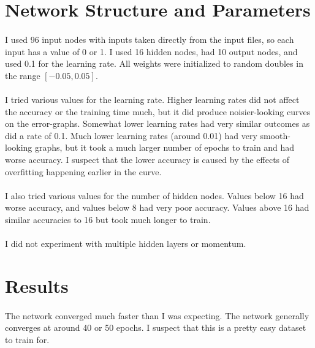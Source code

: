 \documentclass{article}
\begin{document}
\section{Network Structure and Parameters}
\paragraph{}
I used 96 input nodes with inputs taken directly from the input files,
so each input has a value of 0 or 1.  I used 16 hidden nodes, had 10
output nodes, and used 0.1 for the learning rate.  All weights were
initialized to random doubles in the range $[-0.05, 0.05]$.

\paragraph{}
I tried various values for the learning rate.  Higher learning rates did
not affect the accuracy or the training time much, but it did produce
noisier-looking curves on the error-graphs.  Somewhat lower learning rates
had very similar outcomes as did a rate of 0.1.  Much lower learning rates
(around 0.01) had very smooth-looking graphs, but it took a much larger
number of epochs to train and had worse accuracy.  I suspect that the
lower accuracy is caused by the effects of overfitting happening earlier
in the curve.

\paragraph{}
I also tried various values for the number of hidden nodes.  Values below
16 had worse accuracy, and values below 8 had very poor accuracy.  Values
above 16 had similar accuracies to 16 but took much longer to train.

\paragraph{}
I did not experiment with multiple hidden layers or momentum.

\section{Results}
\paragraph{}
The network converged much faster than I was expecting.  The network
generally converges at around 40 or 50 epochs.  I suspect that this is
a pretty easy dataset to train for.
\end{document}
